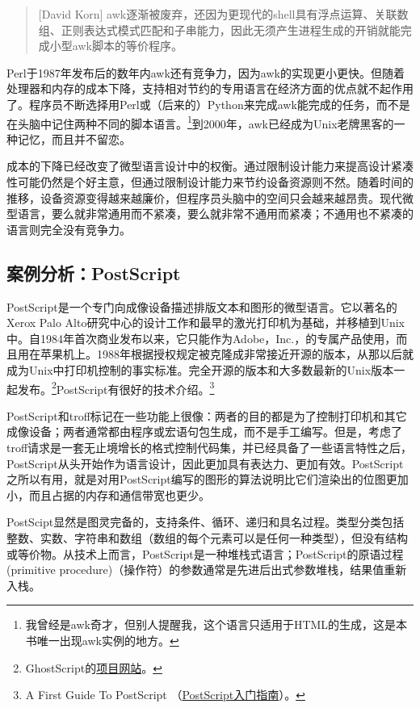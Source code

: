 \documentclass[12pt,oneside]{book}
\begin{document}
\begin{quote}[David Korn]
awk逐渐被废弃，还因为更现代的shell具有浮点运算、关联数组、正则表达式模式匹配和子串能力，因此无须产生进程生成的开销就能完成小型awk脚本的等价程序。
\end{quote}

Perl于1987年发布后的数年内awk还有竞争力，因为awk的实现更小更快。但随着处理器和内存的成本下降，支持相对节约的专用语言在经济方面的优点就不起作用了。程序员不断选择用Perl或（后来的）Python来完成awk能完成的任务，而不是在头脑中记住两种不同的脚本语言。\footnote{我曾经是awk奇才，但别人提醒我，这个语言只适用于HTML的生成，这是本书唯一出现awk实例的地方。}到2000年，awk已经成为Unix老牌黑客的一种记忆，而且并不留恋。

成本的下降已经改变了微型语言设计中的权衡。通过限制设计能力来提高设计紧凑性可能仍然是个好主意，但通过限制设计能力来节约设备资源则不然。随着时间的推移，设备资源变得越来越廉价，但程序员头脑中的空间只会越来越昂贵。现代微型语言，要么就非常通用而不紧凑，要么就非常不通用而紧凑；不通用也不紧凑的语言则完全没有竞争力。


\subsection{案例分析：PostScript}
PostScript是一个专门向成像设备描述排版文本和图形的微型语言。它以著名的Xerox Palo Alto研究中心的设计工作和最早的激光打印机为基础，并移植到Unix中。自1984年首次商业发布以来，它只能作为Adobe，Inc.，的专属产品使用，而且用在苹果机上。1988年根据授权规定被克隆成非常接近开源的版本，从那以后就成为Unix中打印机控制的事实标准。完全开源的版本和大多数最新的Unix版本一起发布。\footnote{GhostScript的\href{http://pages.cs.wisc.edu/~ghost/}{项目网站}。}PostScript有很好的技术介绍。\footnote{A First Guide To PostScript （\href{http://www.tailrecursive.org/postscript/postscript.html}{PostScript入门指南}）。}

PostScript和troff标记在一些功能上很像：两者的目的都是为了控制打印机和其它成像设备；两者通常都由程序或宏语句包生成，而不是手工编写。但是，考虑了troff请求是一套无止境增长的格式控制代码集，并已经具备了一些语言特性之后，PostScript从头开始作为语言设计，因此更加具有表达力、更加有效。PostScript之所以有用，就是对用PostScript编写的图形的算法说明比它们渲染出的位图更加小，而且占据的内存和通信带宽也更少。

PostScipt显然是图灵完备的，支持条件、循环、递归和具名过程。类型分类包括整数、实数、字符串和数组（数组的每个元素可以是任何一种类型），但没有结构或等价物。从技术上而言，PostScript是一种堆栈式语言；PostScript的原语过程(primitive procedure)（操作符）的参数通常是先进后出式参数堆栈，结果值重新入栈。
\end{document}
